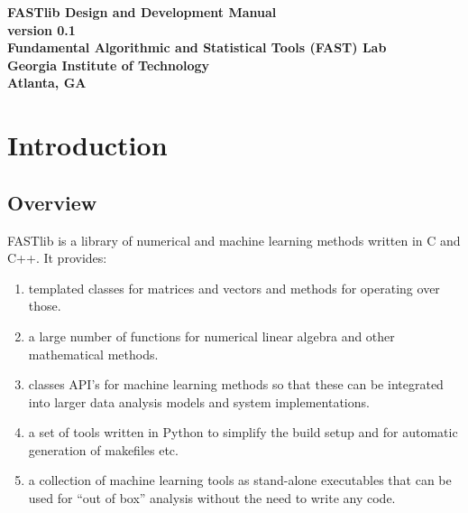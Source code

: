 \documentclass[letter]{report}
\begin{document}
\begin{titlepage}
\begin{center}
\large \bf
FASTlib Design and Development Manual\\
\normalsize version 0.1\\ 
\large \bf Fundamental Algorithmic and Statistical Tools (FAST) Lab\\
Georgia Institute of Technology\\
Atlanta, GA
\end{center}
\end{titlepage}

\tableofcontents

\chapter {Introduction}

\section {Overview}
FASTlib is a library of numerical and machine learning methods written in C and C++. It provides:
\begin{enumerate}
\item templated classes for matrices and vectors and methods for operating over those.
\item a large number of functions for numerical linear algebra and other mathematical methods.
\item classes API's for machine learning methods so that these can be integrated into larger data analysis models and system implementations.
\item a set of tools written in Python to simplify the build setup and for automatic generation of makefiles etc.
\item a collection of machine learning tools as stand-alone executables that can be used for ``out of box'' analysis without the need to write any code.
\end{enumerate}
\end{document}
